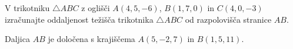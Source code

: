 \documentclass[addpoints]{exam}
\begin{document}
\begin{questions}
    \question[5]
    V trikotniku $\triangle ABC$ z oglišči $A(4,5,-6)$, $B(1,7,0)$ in $C(4,0,-3)$ izračunajte oddaljenost težišča trikotnika $\triangle ABC$ od razpolovišča stranice $AB$.






    













    \newpage

    \question
    Daljica $AB$ je določena s krajiščema $A(5,-2,7)$ in $B(1,5,11)$.
    
\end{questions}
\end{document}
